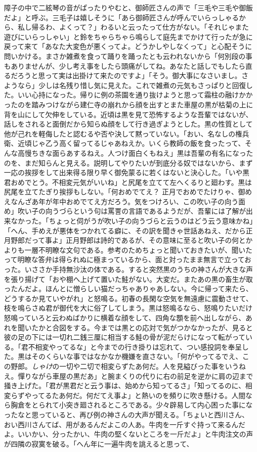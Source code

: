 \documentclass[12pt, openright]{book}
\begin{document}
障子の中で二絃琴の音がぱったりやむと、御師匠さんの声で「三毛や三毛や御飯だよ」と呼ぶ。三毛子は嬉しそうに「あら御師匠さんが呼んでいらっしゃるから、私し帰るわ、よくって？」わるいと云ったって仕方がない。「それじゃまた遊びにいらっしゃい」と鈴をちゃらちゃら鳴らして庭先までかけて行ったが急に戻って来て「あなた大変色が悪くってよ。どうかしやしなくって」と心配そうに問いかける。まさか雑煮を食って踊りを踊ったとも云われないから「何別段の事もありませんが、少し考え事をしたら頭痛がしてね。あなたと話しでもしたら直るだろうと思って実は出掛けて来たのですよ」「そう。御大事になさいまし。さようなら」少しは名残り惜し気に見えた。これで雑煮の元気もさっぱりと回復した。いい心持になった。帰りに例の茶園を通り抜けようと思って霜柱の融けかかったのを踏みつけながら建仁寺の崩れから顔を出すとまた車屋の黒が枯菊の上に背を山にして欠伸をしている。近頃は黒を見て恐怖するような吾輩ではないが、話しをされると面倒だから知らぬ顔をして行き過ぎようとした。黒の性質として他が己れを軽侮したと認むるや否や決して黙っていない。「おい、名なしの権兵衛、近頃じゃ乙う高く留ってるじゃあねえか。いくら教師の飯を食ったって、そんな高慢ちきな面らあするねえ。人つけ面白くもねえ」黒は吾輩の有名になったのを、まだ知らんと見える。説明してやりたいが到底分る奴ではないから、まず一応の挨拶をして出来得る限り早く御免蒙るに若くはないと決心した。「いや黒君おめでとう。不相変元気がいいね」と尻尾を立てて左へくるりと廻わす。黒は尻尾を立てたぎり挨拶もしない。「何おめでてえ？ 正月でおめでたけりゃ、御めえなんざあ年が年中おめでてえ方だろう。気をつけろい、この吹い子の向う面め」吹い子の向うづらという句は罵詈の言語であるようだが、吾輩には了解が出来なかった。「ちょっと伺がうが吹い子の向うづらと云うのはどう云う意味かね」「へん、手めえが悪体をつかれてる癖に、その訳を聞きゃ世話あねえ、だから正月野郎だって事よ」正月野郎は詩的であるが、その意味に至ると吹い子の何とかよりも一層不明瞭な文句である。参考のためちょっと聞いておきたいが、聞いたって明瞭な答弁は得られぬに極まっているから、面と対ったまま無言で立っておった。いささか手持無沙汰の体である。すると突然黒のうちの神さんが大きな声を張り揚げて「おや棚へ上げて置いた鮭がない。大変だ。またあの黒の畜生が取ったんだよ。ほんとに憎らしい猫だっちゃありゃあしない。今に帰って来たら、どうするか見ていやがれ」と怒鳴る。初春の長閑な空気を無遠慮に震動させて、枝を鳴らさぬ君が御代を大に俗了してしまう。黒は怒鳴るなら、怒鳴りたいだけ怒鳴っていろと云わぬばかりに横着な顔をして、四角な顋を前へ出しながら、あれを聞いたかと合図をする。今までは黒との応対で気がつかなかったが、見ると彼の足の下には一切れ二銭三厘に相当する鮭の骨が泥だらけになって転がっている。「君不相変やってるな」と今までの行き掛りは忘れて、つい感投詞を奉呈した。黒はそのくらいな事ではなかなか機嫌を直さない。「何がやってるでえ、この野郎。\emph{しゃけ}の一切や二切で相変らずたあ何だ。人を見縊びった事をいうねえ。憚りながら車屋の黒だあ」と腕まくりの代りに右の前足を逆かに肩の辺まで掻き上げた。「君が黒君だと云う事は、始めから知ってるさ」「知ってるのに、相変らずやってるたあ何だ。何だてえ事よ」と熱いのを頻りに吹き懸ける。人間なら胸倉をとられて小突き廻されるところである。少々辟易して内心困った事になったなと思っていると、再び例の神さんの大声が聞える。「ちょいと西川さん、おい西川さんてば、用があるんだよこの人あ。牛肉を一斤すぐ持って来るんだよ。いいかい、分ったかい、牛肉の堅くないところを一斤だよ」と牛肉注文の声が四隣の寂寞を破る。「へん年に一遍牛肉を誂えると思って、
\end{document}
